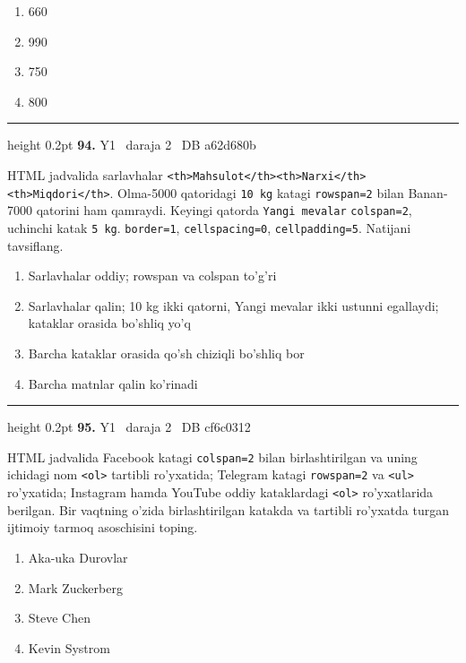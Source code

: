 \documentclass[10pt,a4paper,oneside]{article}
\begin{document}
\begin{enumerate}[label=\Alph*),leftmargin=9mm]
\item 660
\item 990
\item 750
\item 800
\end{enumerate}
\vspace{2mm}\hrule height 0.2pt \vspace{4mm}
\hypertarget{q94}{\textbf{\color{ink}94.}}  {\color{muted}\scriptsize Y1 \textbullet\ daraja 2 \textbullet\ DB a62d680b}
\par
HTML jadvalida sarlavhalar \texttt{\textless{}th\textgreater{}Mahsulot\textless{}/th\textgreater{}\textless{}th\textgreater{}Narxi\textless{}/th\textgreater{}\textless{}th\textgreater{}Miqdori\textless{}/th\textgreater{}}. Olma-5000 qatoridagi \texttt{10 kg} katagi \texttt{rowspan=2} bilan Banan-7000 qatorini ham qamraydi. Keyingi qatorda \texttt{Yangi mevalar} \texttt{colspan=2}, uchinchi katak \texttt{5 kg}. \texttt{border=1}, \texttt{cellspacing=0}, \texttt{cellpadding=5}. Natijani tavsiflang.
\begin{enumerate}[label=\Alph*),leftmargin=9mm]
\item Sarlavhalar oddiy; rowspan va colspan to'g'ri
\item Sarlavhalar qalin; 10 kg ikki qatorni, Yangi mevalar ikki ustunni egallaydi; kataklar orasida bo'shliq yo'q
\item Barcha kataklar orasida qo'sh chiziqli bo'shliq bor
\item Barcha matnlar qalin ko'rinadi
\end{enumerate}
\vspace{2mm}\hrule height 0.2pt \vspace{4mm}
\hypertarget{q95}{\textbf{\color{ink}95.}}  {\color{muted}\scriptsize Y1 \textbullet\ daraja 2 \textbullet\ DB cf6c0312}
\par
HTML jadvalida Facebook katagi \texttt{colspan=2} bilan birlashtirilgan va uning ichidagi nom \texttt{\textless{}ol\textgreater{}} tartibli ro'yxatida; Telegram katagi \texttt{rowspan=2} va \texttt{\textless{}ul\textgreater{}} ro'yxatida; Instagram hamda YouTube oddiy kataklardagi \texttt{\textless{}ol\textgreater{}} ro'yxatlarida berilgan. Bir vaqtning o'zida birlashtirilgan katakda va tartibli ro'yxatda turgan ijtimoiy tarmoq asoschisini toping.
\begin{enumerate}[label=\Alph*),leftmargin=9mm]
\item Aka-uka Durovlar
\item Mark Zuckerberg
\item Steve Chen
\item Kevin Systrom
\end{enumerate}
\end{document}
